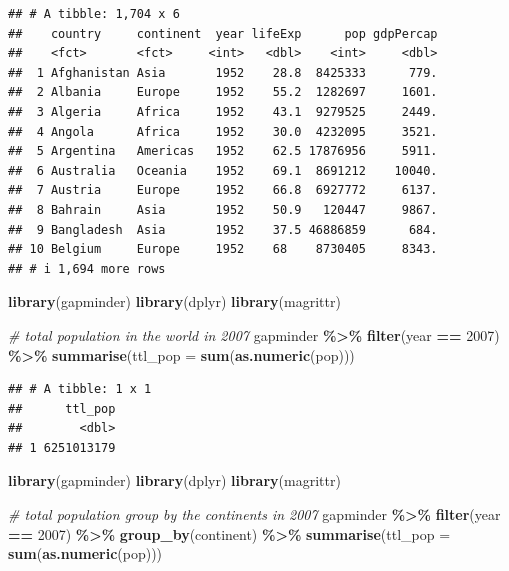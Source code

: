 \documentclass[
]{book}
\newenvironment{Shaded}{\begin{snugshade}}{\end{snugshade}}
\newcommand{\AttributeTok}[1]{\textcolor[rgb]{0.13,0.29,0.53}{#1}}
\newcommand{\CommentTok}[1]{\textcolor[rgb]{0.56,0.35,0.01}{\textit{#1}}}
\newcommand{\DecValTok}[1]{\textcolor[rgb]{0.00,0.00,0.81}{#1}}
\newcommand{\FunctionTok}[1]{\textcolor[rgb]{0.13,0.29,0.53}{\textbf{#1}}}
\newcommand{\NormalTok}[1]{#1}
\newcommand{\SpecialCharTok}[1]{\textcolor[rgb]{0.81,0.36,0.00}{\textbf{#1}}}
\theoremstyle{definition}
\theoremstyle{definition}
\theoremstyle{definition}
\theoremstyle{definition}
\theoremstyle{remark}
\begin{document}
\begin{verbatim}
## # A tibble: 1,704 x 6
##    country     continent  year lifeExp      pop gdpPercap
##    <fct>       <fct>     <int>   <dbl>    <int>     <dbl>
##  1 Afghanistan Asia       1952    28.8  8425333      779.
##  2 Albania     Europe     1952    55.2  1282697     1601.
##  3 Algeria     Africa     1952    43.1  9279525     2449.
##  4 Angola      Africa     1952    30.0  4232095     3521.
##  5 Argentina   Americas   1952    62.5 17876956     5911.
##  6 Australia   Oceania    1952    69.1  8691212    10040.
##  7 Austria     Europe     1952    66.8  6927772     6137.
##  8 Bahrain     Asia       1952    50.9   120447     9867.
##  9 Bangladesh  Asia       1952    37.5 46886859      684.
## 10 Belgium     Europe     1952    68    8730405     8343.
## # i 1,694 more rows
\end{verbatim}

\begin{Shaded}
\begin{Highlighting}[]
\FunctionTok{library}\NormalTok{(gapminder)}
\FunctionTok{library}\NormalTok{(dplyr)}
\FunctionTok{library}\NormalTok{(magrittr)}

\CommentTok{\# total population in the world in 2007}
\NormalTok{gapminder }\SpecialCharTok{\%\textgreater{}\%}
  \FunctionTok{filter}\NormalTok{(year }\SpecialCharTok{==} \DecValTok{2007}\NormalTok{) }\SpecialCharTok{\%\textgreater{}\%}
  \FunctionTok{summarise}\NormalTok{(}\AttributeTok{ttl\_pop =} \FunctionTok{sum}\NormalTok{(}\FunctionTok{as.numeric}\NormalTok{(pop)))}
\end{Highlighting}
\end{Shaded}

\begin{verbatim}
## # A tibble: 1 x 1
##      ttl_pop
##        <dbl>
## 1 6251013179
\end{verbatim}

\begin{Shaded}
\begin{Highlighting}[]
\FunctionTok{library}\NormalTok{(gapminder)}
\FunctionTok{library}\NormalTok{(dplyr)}
\FunctionTok{library}\NormalTok{(magrittr)}

\CommentTok{\# total population group by the continents in 2007}
\NormalTok{gapminder }\SpecialCharTok{\%\textgreater{}\%}
  \FunctionTok{filter}\NormalTok{(year }\SpecialCharTok{==} \DecValTok{2007}\NormalTok{) }\SpecialCharTok{\%\textgreater{}\%}
  \FunctionTok{group\_by}\NormalTok{(continent) }\SpecialCharTok{\%\textgreater{}\%}
  \FunctionTok{summarise}\NormalTok{(}\AttributeTok{ttl\_pop =} \FunctionTok{sum}\NormalTok{(}\FunctionTok{as.numeric}\NormalTok{(pop)))}
\end{Highlighting}
\end{Shaded}
\end{document}
